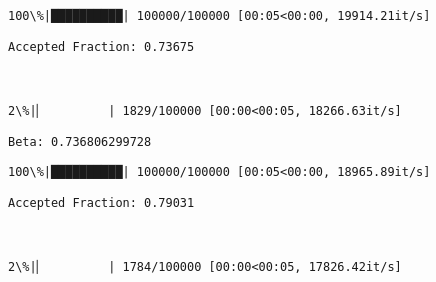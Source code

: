 \documentclass[11pt]{article}
\begin{document}
    \begin{Verbatim}[commandchars=\\\{\}]
100\%|██████████| 100000/100000 [00:05<00:00, 19914.21it/s]

    \end{Verbatim}

    \begin{Verbatim}[commandchars=\\\{\}]
Accepted Fraction: 0.73675

    \end{Verbatim}

    \begin{center}
    \end{center}
    { \hspace*{\fill} \\}
    
    \begin{Verbatim}[commandchars=\\\{\}]
  2\%|▏         | 1829/100000 [00:00<00:05, 18266.63it/s]
    \end{Verbatim}

    \begin{Verbatim}[commandchars=\\\{\}]
Beta: 0.736806299728

    \end{Verbatim}

    \begin{Verbatim}[commandchars=\\\{\}]
100\%|██████████| 100000/100000 [00:05<00:00, 18965.89it/s]

    \end{Verbatim}

    \begin{Verbatim}[commandchars=\\\{\}]
Accepted Fraction: 0.79031

    \end{Verbatim}

    \begin{center}
    \end{center}
    { \hspace*{\fill} \\}
    
    \begin{Verbatim}[commandchars=\\\{\}]
  2\%|▏         | 1784/100000 [00:00<00:05, 17826.42it/s]
    \end{Verbatim}
\end{document}

